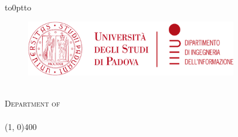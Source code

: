 \begin{titlingpage}
	\begin{center}
		\vbox to0pt{\vbox to\vss}
		\begin{figure}
			\centering
			\includegraphics[height=2.45cm]{themes/unipd-dei/static/unipd-dei.png}%
		\end{figure}

		{\scshape \Large{\bfseries{\UnivName}}} \\
		{\scshape \large{Department of \DeptName}} \\
		\vspace{3pt}
		{\scshape \large{\textit{\DegreeName}}} \\
		\line(1, 0){400} \\

		\vspace{1cm}
		{\huge{\bfseries{\textcolor{SchoolColor}{\Title}}} \par}\vspace{0.7cm} %
		\vspace{1cm}


\end{center}
\end{titlingpage}
